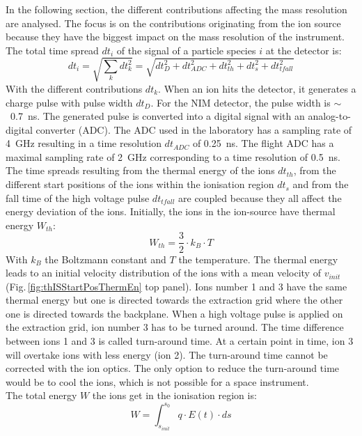 	In the following section, the different contributions affecting the mass resolution are analysed. The focus is on the contributions originating from the ion source because they have the biggest impact on the mass resolution of the instrument.\\
	The total time spread $dt_i$ of the signal of a particle species $i$ at the detector is:
	\begin{equation}
		dt_i = \sqrt{\sum_{k} dt_k^2} = \sqrt{dt_D^2 + dt_{ADC}^2 + dt_{th}^2 + dt_{s}^2 + dt_{tfall}^2} 
	\end{equation}
	With the different contributions $dt_k$. When an ion hits the detector, it generates a charge pulse with pulse width $dt_D$. For the NIM detector, the pulse width is $\sim$~0.7~ns. The generated pulse is converted into a digital signal with an analog-to-digital converter (ADC). The ADC used in the laboratory has a sampling rate of 4~GHz resulting in a time resolution $dt_{ADC}$ of 0.25~ns. The flight ADC has a maximal sampling rate of 2~GHz corresponding to a time resolution of 0.5~ns.\\


	The time spreads resulting from the thermal energy of the ions $dt_{th}$, from the different start positions of the ions within the ionisation region $dt_s$ and from the fall time of the high voltage pulse $dt_{tfall}$ are coupled because they all affect the energy deviation of the ions. Initially, the ions in the ion-source have thermal energy $W_{th}$:
	\begin{equation}
		W_{th} = \frac{3}{2}\cdot k_B \cdot T
	\end{equation}
	With $k_B$ the Boltzmann constant and $T$ the temperature. The thermal energy leads to an initial velocity distribution of the ions with a mean velocity of $v_{init}$ (Fig.\,\ref{fig:thISStartPosThermEn} top panel). Ions number 1 and 3 have the same thermal energy but one is directed towards the extraction grid where the other one is directed towards the backplane. When a high voltage pulse is applied on the extraction grid, ion number 3 has to be turned around. The time difference between ions 1 and 3 is called turn-around time. At a certain point in time, ion 3 will overtake ions with less energy (ion 2). The turn-around time cannot be corrected with the ion optics. The only option to reduce the turn-around time would be to cool the ions, which is not possible for a space instrument.\\
	The total energy $W$ the ions get in the ionisation region is:
	\begin{equation}
		W = \int_{s_{init}}^{s_0} q\cdot E(t)\cdot ds
		\label{eq:WionsISposEt}
	\end{equation}

